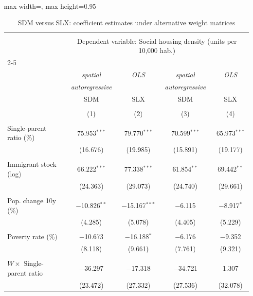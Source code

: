 
\begin{table}[!htbp] \centering 
  \caption{SDM versus SLX: coefficient estimates under alternative weight matrices} 
  \label{tab:sdm_slx} 
\begin{adjustbox}{max width=\linewidth, max height=0.95\textheight}
\begin{tabular}{@{\extracolsep{5pt}}lcccc} 
\\[-1.8ex]\hline 
\hline \\[-1.8ex] 
 & \multicolumn{4}{c}{Dependent variable: Social housing density (units per 10,000 hab.)} \\ 
\cline{2-5} 
\\[-1.8ex] & \textit{spatial} & \textit{OLS} & \textit{spatial} & \textit{OLS} \\ 
 & \textit{autoregressive} & \textit{} & \textit{autoregressive} & \textit{} \\ 
 & SDM & SLX & SDM & SLX \\ 
\\[-1.8ex] & (1) & (2) & (3) & (4)\\ 
\hline \\[-1.8ex] 
 Single-parent ratio (\%) & 75.953$^{***}$ & 79.770$^{***}$ & 70.599$^{***}$ & 65.973$^{***}$ \\ 
  & (16.676) & (19.985) & (15.891) & (19.177) \\ 
  & & & & \\ 
 Immigrant stock (log) & 66.222$^{***}$ & 77.338$^{***}$ & 61.854$^{**}$ & 69.442$^{**}$ \\ 
  & (24.363) & (29.073) & (24.740) & (29.661) \\ 
  & & & & \\ 
 Pop. change 10y (\%) & $-$10.826$^{**}$ & $-$15.167$^{***}$ & $-$6.115 & $-$8.917$^{*}$ \\ 
  & (4.285) & (5.078) & (4.405) & (5.229) \\ 
  & & & & \\ 
 Poverty rate (\%) & $-$10.673 & $-$16.188$^{*}$ & $-$6.176 & $-$9.352 \\ 
  & (8.118) & (9.661) & (7.761) & (9.321) \\ 
  & & & & \\ 
 $W \times$ Single-parent ratio & $-$36.297 & $-$17.318 & $-$34.721 & 1.307 \\ 
  & (23.472) & (27.332) & (27.536) & (32.078) \\ 

\end{tabular}
\end{adjustbox}
\end{table}
